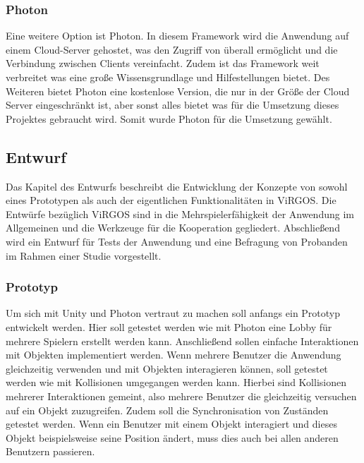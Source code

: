 \subsubsection{Photon}
Eine weitere Option ist Photon. In diesem Framework wird die Anwendung auf einem Cloud-Server gehostet, was den Zugriff von überall ermöglicht und die Verbindung zwischen Clients vereinfacht. Zudem ist das Framework weit verbreitet was eine große Wissensgrundlage und Hilfestellungen bietet. Des Weiteren bietet Photon eine kostenlose Version, die nur in der Größe der Cloud Server eingeschränkt ist, aber sonst alles bietet was für die Umsetzung dieses Projektes gebraucht wird. Somit wurde Photon für die Umsetzung gewählt. 

\subsection{Entwurf}
Das Kapitel des Entwurfs beschreibt die Entwicklung der Konzepte von sowohl eines Prototypen als auch der eigentlichen Funktionalitäten in ViRGOS. Die Entwürfe bezüglich ViRGOS sind in die Mehrspielerfähigkeit der Anwendung im Allgemeinen und die Werkzeuge für die Kooperation gegliedert. Abschließend wird ein Entwurf für Tests der Anwendung und eine Befragung von Probanden im Rahmen einer Studie vorgestellt.

\subsubsection{Prototyp}
Um sich mit Unity und Photon vertraut zu machen soll anfangs ein Prototyp entwickelt werden. Hier soll getestet werden wie mit Photon eine Lobby für mehrere Spielern erstellt werden kann. Anschließend sollen einfache Interaktionen mit Objekten implementiert werden. Wenn mehrere Benutzer die Anwendung gleichzeitig verwenden und mit Objekten interagieren können, soll getestet werden wie mit Kollisionen umgegangen werden kann. Hierbei sind Kollisionen mehrerer Interaktionen gemeint, also mehrere Benutzer die gleichzeitig versuchen auf ein Objekt zuzugreifen. Zudem soll die Synchronisation von Zuständen getestet werden. Wenn ein Benutzer mit einem Objekt interagiert und dieses Objekt beispielsweise seine Position ändert, muss dies auch bei allen anderen Benutzern passieren. 


